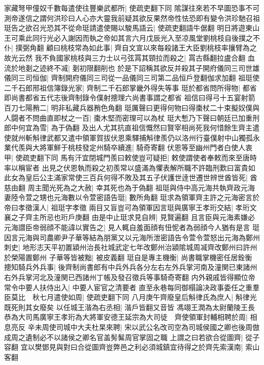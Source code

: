 家藏弩甲僮奴千數每遣使往豐樂武都所|{
	使疏吏翻下同}
隂謀往來若不早圖恐事不可測帝遂信之謂何洪珍曰人心亦大靈我前疑其欲反果然帝性怯恐即有變令洪珍馳召祖珽告之欲召光恐其不從命珽請遣使賜以駿馬語云|{
	使疏吏翻語牛倨翻}
明日將遊東山王可乘此同行光必入謝因而執之帝如其言六月戊辰光入至凉風堂劉桃枝自後撲之不仆|{
	撲弼角翻}
顧曰桃枝常為如此事|{
	齊自文宣以來每殺諸王大臣劉桃枝率攘臂為之故光云然}
我不負國家桃枝與三力士以弓弦罥其頸拉而殺之|{
	罥古縣翻拉盧合翻}
血流於地剗之迹終不㓕|{
	剗初限翻削也}
於是下詔稱其欲反并殺其子開府儀同三司世雄儀同三司恒伽|{
	齊制開府儀同三司從一品儀同三司第二品恒戶登翻伽求加翻}
祖珽使二千石郎邢祖信簿錄光家|{
	齊制二千石郎掌畿外得失等事}
珽於都省問所得物|{
	都省即尚書都省五代志後齊制錄令僕射摠理六尚書事謂之都省}
祖信曰得弓十五宴射箭百刀七陽矟二|{
	明非私藏兵器矟色角翻}
珽厲聲曰更得何物曰得棗杖二十束擬奴僕與人闘者不問曲直即杖之一百|{
	棗木堅而密理可以為杖}
珽大慙乃下聲曰朝廷已加重刑郎中何宜為雪|{
	為于偽翻}
及出人尤其抗直祖信慨然曰賢宰相尚死我何惜餘生齊主遣使就州斬斛律武都又遣中領軍賀拔伏恩乘驛捕斛律羨仍以洛州行臺僕射中山獨孤永業代羨與大將軍鮮于桃枝發定州騎卒續進|{
	騎奇寄翻}
伏恩等至幽州門者白使人衷甲|{
	使疏吏翻下同}
馬有汗宜閉城門羨曰敕使豈可疑拒|{
	敕使謂使者奉敕而來至唐時率以稱宦者}
出見之伏恩執而殺之初羨常以盛滿為懼表解所職不許臨刑歎曰富貴如此女為皇后公主滿家常使三百兵何得不敗及其五子伏護世逹世遷世辨世酋皆死|{
	酋慈由翻}
周主聞光死為之大赦|{
	幸其死也為于偽翻}
祖珽與侍中高元海共執齊政元海妻陸令萱之甥也元海數以令萱密語告珽|{
	數所角翻}
珽求為領軍齊主許之元海密言於帝曰孝徵漢人|{
	祖珽字孝徵}
兩目又盲豈可為領軍因言珽與廣寧王孝珩交結|{
	孝珩文襄之子齊主所忌也珩戶庚翻}
由是中止珽求見自辨|{
	見賢遍翻}
且言臣與元海素嫌必元海譛臣帝弱顔不能諱以實告之|{
	見人輒自羞面顔有忸怩者為弱顔今人猶有是言}
珽因言元海與司農卿尹子華等結為朋黨又以元海所泄密語告令萱令萱怒出元海為鄭州刺史|{
	地形志天平初置潁州治長社城武定七年改鄭州治潁隂城周㓕齊改鄭州曰許州於榮陽置鄭州}
子華等皆被黜|{
	被皮義翻}
珽自是專主機衡|{
	尚書職掌機密任居銓衡}
摠知騎兵外兵事|{
	後齊制尚書郎有中兵外兵各分左右左外兵掌河南及潼関已東諸州右外兵掌河北及潼関已西諸州丁帳及發召徵兵等事騎奇寄翻}
内外親戚皆得顯位帝常令中要人扶侍出入|{
	中要人宦官之清要者}
直至永巷每同御榻論决政事委任之重羣臣莫比　秋七月遣使如周|{
	使疏吏翻下同}
八月庚午齊廢皇后斛律氏為庶人|{
	斛律光既死則其女廢矣}
以任城王湝為右丞相|{
	湝戶皆翻又音皆}
馮翊王潤為太尉蘭陵王長恭為大司馬廣寧王孝珩為大將軍安德王延宗為大司徒　齊使領軍封輔相聘於周|{
	相息亮反}
辛未周使司城中大夫杜杲來聘|{
	宋以武公名改司空為司城侯國之卿也後周倣成周之遺制必不以諸侯之卿名官盖髣髴周官掌固之職}
上謂之曰若欲合從圖齊|{
	從子容翻}
宜以樊鄧見與對曰合從圖齊豈弊邑之利必須城鎮宜待得之於齊先索漢南|{
	索山客翻}
